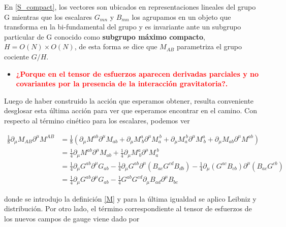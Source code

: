 \documentclass{article}
\numberwithin{equation}{section}
\begin{document}
En \ref{S_compact}, los vectores son ubicados en representaciones lineales del grupo G mientras que los escalares $ G_{m n} $ y $ B_{m n} $ los agrupamos en un objeto que transforma en la bi-fundamental del grupo y es invariante ante un subgrupo particular de G conocido como \textbf{subgrupo máximo compacto}, $ H= O(N) \times O(N) $, de esta forma se dice que $ M_{A B} $ parametriza el grupo cociente $ G/H $.\\


\begin{itemize}
	\item \textcolor{red}{\textbf{¿Porque en el tensor de esfuerzos aparecen derivadas parciales y no covariantes por la presencia de la interacción gravitatoria?.}}
\end{itemize}

Luego de haber construido la acción que esperamos obtener, resulta conveniente desglosar esta última acción para ver que esperamos encontrar en el camino. Con respecto al término cinético para los escalares, podemos ver


\begin{equation} \label{DMDM}
\begin{aligned}
\frac{1}{8}\partial_{\mu} M_{A B} \partial^{\mu} M^{A B} &= \frac{1}{8} \left( \partial_{\mu} M^{a b} \partial^{\mu} M_{a b}  + \partial_{\mu} M^a_{\ b} \partial^{\mu} M_a^{\ b} + \partial_{\mu} M_a^{\ b} \partial^{\mu} M^a_{\ b} + \partial_{\mu} M_{a b} \partial^{\mu} M^{a b} \right)\\
&= \frac{1}{4} \partial_{\mu} M^{a b} \partial^{\mu} M_{a b} + \frac{1}{4} \partial_{\mu} M^a_{\ b} \partial^{\mu} M_a^{\ b}\\
&= \frac{1}{4} \partial_{\mu} G^{a b}\partial^{\mu} G_{a b} - \frac{1}{4}\partial_{\mu} G^{a b} \partial^{\mu} \left(B_{a c} G^{c d} B_{d b} \right) - \frac{1}{4} \partial_{\mu} \left(G^{a c} B_{c b}\right) \partial^{\mu} \left( B_{a c} G^{c b}\right)\\
&= \frac{1}{4} \partial_{\mu} G^{a b}\partial^{\mu} G_{a b} - \frac{1}{4} G^{a b} G^{c d} \partial_{\mu} B_{a d} \partial^{\mu} B_{b c}
\end{aligned}
\end{equation}

donde se introdujo la definición \ref{M} y para la última igualdad se aplico Leibniz y distribución. Por otro lado, el término correspondiente al tensor de esfuerzos de los nuevos campos de gauge viene dado por
\end{document}
